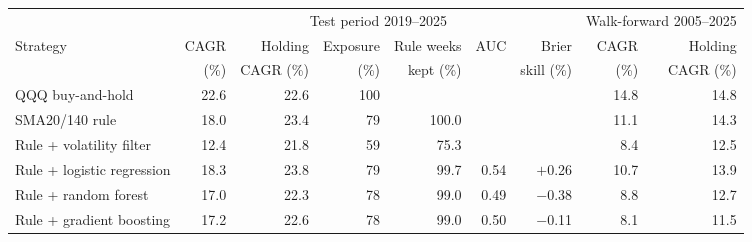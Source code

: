 \begin{tabular}{lrrrrrrrr}
\toprule
 & \multicolumn{6}{c}{Test period 2019--2025} & \multicolumn{2}{c}{Walk-forward 2005--2025} \\
\cmidrule(lr){2-7}\cmidrule(lr){8-9}
Strategy & CAGR & Holding & Exposure & Rule weeks & AUC & Brier & CAGR & Holding \\
 & (\%) & CAGR (\%) & (\%) & kept (\%) & & skill (\%) & (\%) & CAGR (\%) \\
\midrule
QQQ buy-and-hold & 22.6 & 22.6 & 100 &  &  &  & 14.8 & 14.8 \\
SMA20/140 rule & 18.0 & 23.4 & 79 & 100.0 &  &  & 11.1 & 14.3 \\
Rule + volatility filter & 12.4 & 21.8 & 59 & 75.3 &  &  & 8.4 & 12.5 \\
\addlinespace
Rule + logistic regression & 18.3 & 23.8 & 79 & 99.7 & 0.54 & $+$0.26 & 10.7 & 13.9 \\
Rule + random forest & 17.0 & 22.3 & 78 & 99.0 & 0.49 & $-$0.38 & 8.8 & 12.7 \\
Rule + gradient boosting & 17.2 & 22.6 & 78 & 99.0 & 0.50 & $-$0.11 & 8.1 & 11.5 \\
\bottomrule
\end{tabular}
